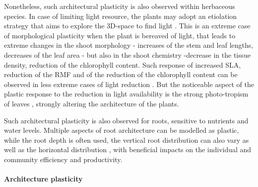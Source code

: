 Nonetheless, such architectural plasticity is also observed within herbaceous species. In case of limiting light resource, the plants may adopt an etiolation strategy that aims to explore the 3D-space to find light \parencite{whippo_phototropism:_2006}. This is an extreme case of morphological plasticity when the plant is bereaved of light, that leads to extreme changes in the shoot morphology - increases of the stem and leaf lengths, decreases of the leaf area - but also in the shoot chemistry -decrease in the tissue density, reduction of the chlorophyll content. Such response of increased SLA, reduction of the RMF and of the reduction of the chlorophyll content can be observed in less extreme cases of light reduction \parencite{mitchell_intraspecific_2014}. But the noticeable aspect of the plastic response to the reduction in light availability is the strong photo-tropism of leaves \parencite{whippo_phototropism:_2006}, strongly altering the architecture of the plants.

Such architectural plasticity is also observed for roots, sensitive to nutrients and water levels. Multiple aspects of root architecture can be modelled as plastic, while the root depth is often used, the vertical root distribution can also vary \parencite{nippert_challenging_2015} as well as the horizontal distribution \cite{maire_plasticity_2013}, with beneficial impacts on the individual and community efficiency and productivity.


\paragraph{Architecture plasticity}

